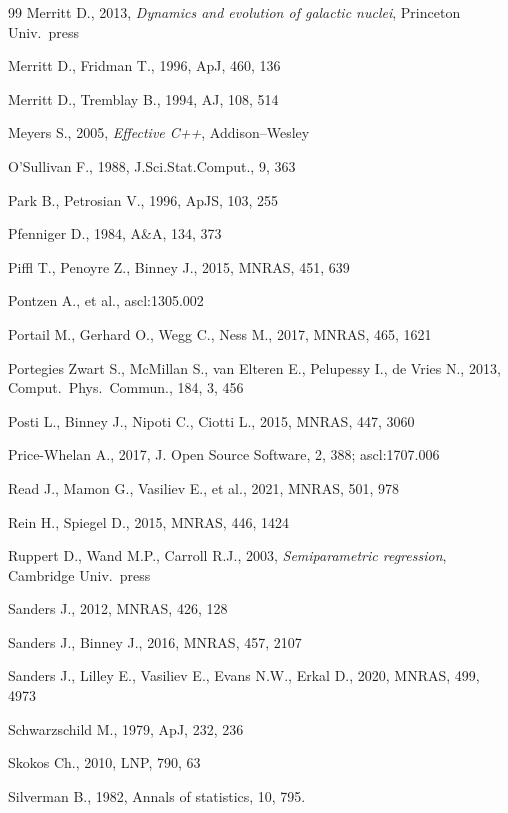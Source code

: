 \documentclass[12pt]{article}
\begin{document}
\begin{thebibliography}{99}
Merritt D., 2013, \textsl{Dynamics and evolution of galactic nuclei}, Princeton Univ.\ press

Merritt D., Fridman T., 1996, ApJ, 460, 136

Merritt D., Tremblay B., 1994, AJ, 108, 514

Meyers S., 2005, \textsl{Effective C++}, Addison--Wesley

O'Sullivan F., 1988, J.Sci.Stat.Comput., 9, 363

Park B., Petrosian V., 1996, ApJS, 103, 255

Pfenniger D., 1984, A\&A, 134, 373

Piffl T., Penoyre Z., Binney J., 2015, MNRAS, 451, 639

Pontzen A., et al., ascl:1305.002

Portail M., Gerhard O., Wegg C., Ness M., 2017, MNRAS, 465, 1621

Portegies Zwart S., McMillan S., van Elteren E., Pelupessy I., de Vries N., 2013, Comput.\ Phys.\ Commun., 184, 3, 456

Posti L., Binney J., Nipoti C., Ciotti L., 2015, MNRAS, 447, 3060

Price-Whelan A., 2017, J. Open Source Software, 2, 388; ascl:1707.006

Read J., Mamon G., Vasiliev E., et al., 2021, MNRAS, 501, 978

Rein H., Spiegel D., 2015, MNRAS, 446, 1424

Ruppert D., Wand M.P., Carroll R.J., 2003, \textsl{Semiparametric regression}, Cambridge Univ.\ press

Sanders J., 2012, MNRAS, 426, 128

Sanders J., Binney J., 2016, MNRAS, 457, 2107

Sanders J., Lilley E., Vasiliev E., Evans N.W., Erkal D., 2020, MNRAS, 499, 4973

Schwarzschild M., 1979, ApJ, 232, 236

Skokos Ch., 2010, LNP, 790, 63

Silverman B., 1982, Annals of statistics, 10, 795.


\end{thebibliography}
\end{document}
